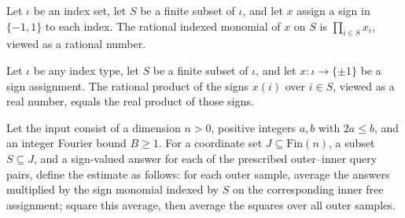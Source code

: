\begin{definition}
\label{FABL.rationalIndexedMonomial}
\leanok
{}
Let $\iota$ be an index set, let $S$ be a finite subset of $\iota$, and let $x$ assign a
sign in $\{ -1,1\}$ to each index. The rational indexed monomial of $x$ on $S$ is
$\prod_{i\in S} x_i$, viewed as a rational number.
\end{definition}

\begin{theorem}
\label{FABL.rationalIndexedMonomial_cast}
\leanok
{}
Let $\iota$ be any index type, let $S$ be a finite subset of $\iota$, and let
$x:\iota\to\{\pm1\}$ be a sign assignment. The rational product of the signs $x(i)$ over
$i\in S$, viewed as a real number, equals the real product of those signs.
\end{theorem}

\begin{definition}
\label{FABL.rationalRestrictedFourierWeightEstimateFromAnswers}
\leanok
{}
Let the input consist of a dimension $n>0$, positive integers $a,b$ with $2a\le b$, and
an integer Fourier bound $B\ge1$. For a coordinate set $J\subseteq\mathrm{Fin}(n)$, a
subset $S\subseteq J$, and a sign-valued answer for each of the prescribed outer–inner
query pairs, define the estimate as follows: for each outer sample, average the answers
multiplied by the sign monomial indexed by $S$ on the corresponding inner free
assignment; square this average, then average the squares over all outer samples.
\end{definition}

